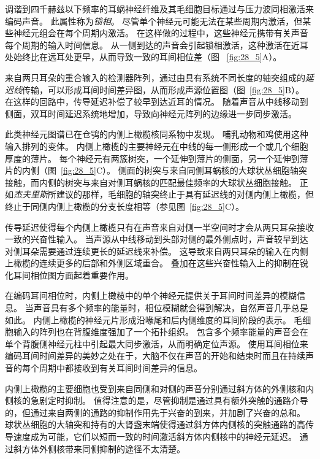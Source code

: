 调谐到四千赫兹以下频率的耳蜗神经纤维及其毛细胞目标通过与压力波同相激活来编码声音。
此属性称为\textit{锁相}。
尽管单个神经元可能无法在某些周期内激活，但某些神经元组会在每个周期内激活。
在这样做的过程中，这些神经元携带有关声音每个周期的输入时间信息。 
从一侧到达的声音会引起锁相激活，这种激活在近耳处始终比在远耳处更早，从而导致一致的耳间相位差（图 ~\ref{fig:28_5}A）。


来自两只耳朵的重合输入的检测器阵列，通过由具有系统不同长度的轴突组成的\textit{延迟线}传输，可以形成耳间时间差异图，从而形成声源位置图\cite{jeffress1948place}（图~\ref{fig:28_5}B）。
在这样的回路中，传导延迟补偿了较早到达近耳的情况。
随着声音从中线移动到侧面，双耳时间延迟系统地增加，导致向神经元阵列的边缘进一步同步激活。


此类神经元图谱已在仓鸮的内侧上橄榄核同系物中发现。
哺乳动物和鸡使用这种输入排列的变体。
内侧上橄榄的主要神经元在中线的每一侧形成一个或几个细胞厚度的薄片。 
每个神经元有两簇树突，一个延伸到薄片的侧面，另一个延伸到薄片的内侧（图~\ref{fig:28_5}C）。
侧面的树突与来自同侧耳蜗核的大球状丛细胞轴突接触，而内侧的树突与来自对侧耳蜗核的匹配最佳频率的大球状丛细胞接触。
正如\textit{杰夫里斯}所建议的那样，毛细胞的轴突终止于具有延迟线的对侧内侧上橄榄，但终止于同侧内侧上橄榄的分支长度相等（参见图~\ref{fig:28_5}C）。


传导延迟使得每个内侧上橄榄只有在声音来自对侧一半空间时才会从两只耳朵接收一致的兴奋性输入。
当声源从中线移动到头部对侧的最外侧点时，声音较早到达对侧耳朵需要通过连续更长的延迟线来补偿。
这导致来自两只耳朵的输入在内侧上橄榄的连续更多的后部和外侧区域重合。
叠加在这些兴奋性输入上的抑制在锐化耳间相位图方面起着重要作用。


在编码耳间相位时，内侧上橄榄中的单个神经元提供关于耳间时间差异的模糊信息。
当声音具有多个频率的能量时，相位模糊就会得到解决，自然声音几乎总是如此。
内侧上橄榄的神经元片形成沿喙尾和后内侧维度的耳间阶段的表示。
毛细胞输入的阵列也在背腹维度强加了一个拓扑组织。
包含多个频率能量的声音会在单个背腹侧神经元柱中引起最大同步激活，从而明确定位声源。
使用耳间相位来编码耳间时间差异的美妙之处在于，大脑不仅在声音的开始和结束时而且在持续声音的每个周期中都接收到有关耳间时间差异的信息。


内侧上橄榄的主要细胞也受到来自同侧和对侧的声音分别通过斜方体的外侧核和内侧核的急剧定时抑制。
值得注意的是，尽管抑制是通过具有额外突触的通路介导的，但通过来自两侧的通路的抑制作用先于兴奋的到来，并加剧了兴奋的总和。
球状丛细胞的大轴突和持有的大肾盏末端使得通过斜方体内侧核的突触通路的高传导速度成为可能，它们以短而一致的时间激活斜方体内侧核中的神经元延迟。
通过斜方体外侧核带来同侧抑制的途径不太清楚。


